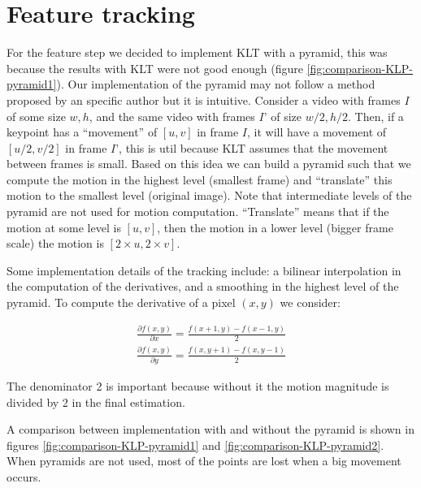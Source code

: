 \section{Feature tracking}

For the feature step we decided to implement KLT with a pyramid, this was because the results with KLT were not good enough (figure \ref{fig:comparison-KLP-pyramid1}). Our implementation of the pyramid may not follow a method proposed by an specific author but it is intuitive. Consider a video with frames $I$ of some size $w, h$, and the same video with frames $I’$ of size $w/2, h/2$. Then, if a keypoint has a “movement” of $[u, v]$ in frame $I$, it will have a movement of $[u/2, v/2]$ in frame $I’$, this is util because KLT assumes that the movement between frames is small. Based on this idea we can build a pyramid such that we compute the motion in the highest level (smallest frame) and “translate” this motion to the smallest level (original image). Note that intermediate levels of the pyramid are not used for motion computation. “Translate” means that if the motion at some level is $[u, v]$, then the motion in a lower level (bigger frame scale) the motion is $[2\times u, 2 \times v]$. 

Some implementation details of the tracking include: a bilinear interpolation in the computation of the derivatives, and a smoothing in the highest level of the pyramid. To compute the derivative of a pixel $(x, y)$ we consider:

\begin{equation}
\begin{split}
\frac{\partial f(x, y)}{\partial x} = \frac{f(x+ 1, y) - f(x-1, y)}{2} \\
\frac{\partial f(x, y)}{\partial y} = \frac{f(x, y + 1) - f(x, y - 1)}{2}
\end{split}
\label{eq:partial-derivatives}
\end{equation}

The denominator 2 is important because without it the motion magnitude is divided by 2 in the final estimation.

A comparison between implementation with and without the pyramid is shown in figures \ref{fig:comparison-KLP-pyramid1} and \ref{fig:comparison-KLP-pyramid2}. When pyramids are not used, most of the points are lost when a big movement occurs.

